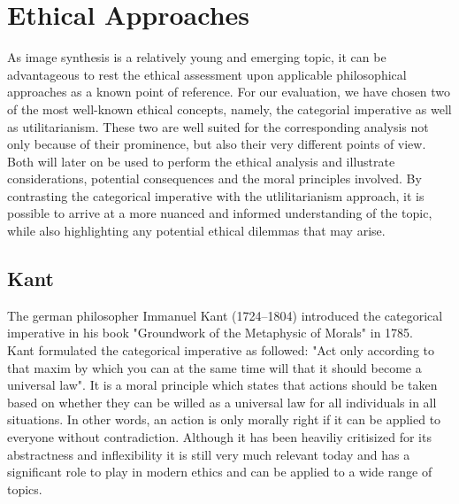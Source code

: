 \documentclass[10pt,twocolumn,twoside]{osajnl}
\begin{document}
\section{Ethical Approaches}
As image synthesis is a relatively young and emerging topic, it can be advantageous to rest the ethical assessment upon applicable philosophical approaches as a known point of reference.
For our evaluation, we have chosen two of the most well-known ethical concepts, namely, the categorial imperative as well as utilitarianism. These two are well suited for the corresponding analysis not only because of their prominence, but also their 
very different points of view.\\
Both will later on be used to perform the ethical analysis and illustrate considerations, potential consequences and the moral principles involved.
By contrasting the categorical imperative with the utlilitarianism approach, it is possible to arrive at a more nuanced and informed understanding of the topic, while also highlighting any potential ethical dilemmas that may arise.

\subsection{Kant}
The german philosopher Immanuel Kant (1724--1804) introduced the categorical imperative in his book "Groundwork of the Metaphysic of Morals" in 1785. \\
Kant formulated the categorical imperative as followed: "Act only according to that maxim by which you can at the same time will that it should become a universal law". 
It is a moral principle which states that actions should be taken based on whether they can be willed as a universal law for all individuals in all situations. 
In other words, an action is only morally right if it can be applied to everyone without contradiction.
Although it has been heaviliy critisized for its abstractness and inflexibility it is still very much relevant today and has a significant role to play in modern ethics and can be applied to a wide range of topics. %
\end{document}
